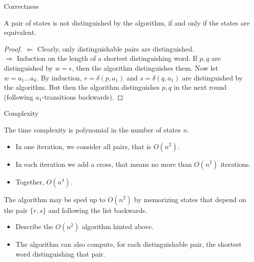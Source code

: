 \documentclass[handout]{beamer}
\begin{document}
\begin{frame}{Correctness}

    \begin{theorem}
        A pair of states is not distinguished by the algorithm, if and only if the states are equivalent.
    \end{theorem}
    \begin{proof}
        \alert{\Large$\Leftarrow$} Clearly, only distinguishable pairs are distinguished.\\ 
        \alert{\Large$\Rightarrow$} Induction on the length of a shortest distinguishing word. If $p,q$ are distinguished by $w=\epsilon$, then the algorithm distinguishes them. Now let $w=a_1\ldots a_k$. By induction, $r=\delta(p,a_1)$ and $s=\delta(q,a_1)$ are distinguished by the algorithm. But then the algorithm distinguishes $p,q$ in the next round (following $a_1$-transitions backwards).
    \end{proof}        
    
\end{frame}


\begin{frame}{Complexity}

    
    The time complexity is polynomial in the number of states $n$.
    \begin{itemize}
        \item In one iteration, we consider all pairs, that is $O(n^2)$.
        \item In each iteration we add a cross, that means no more than  $O(n^2)$ iterations.
        \item Together, $O(n^4)$.
    \end{itemize}
    The algorithm may be sped up to $O(n^2)$ by memorizing states that depend on the pair $\{r,s\}$ and following the list backwards.

        
    \begin{exercise}
        \begin{itemize}
            \item Describe the $O(n^2)$ algorithm hinted above.    
            \item The algorithm can also compute, for each distinguishable pair, the shortest word distinguishing that pair.
        \end{itemize}
    \end{exercise}
    
\end{frame}
\end{document}
